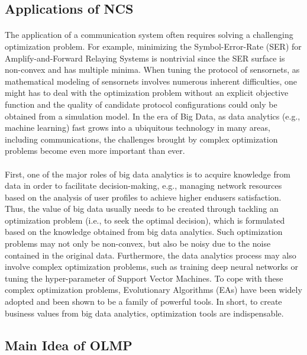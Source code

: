 \documentclass[10pt,letterpaper]{article}
\begin{document}
\subsection{Applications of NCS}

\paragraph{}
The application of a communication system often requires solving a challenging optimization problem. For example, minimizing the Symbol-Error-Rate (SER) for Amplify-and-Forward Relaying Systems is nontrivial since the SER surface is non-convex and has multiple minima\cite{Ahmed2015Minimizing}. When tuning the protocol of sensornets\cite{TateEvolutionary}, as mathematical modeling of sensornets involves numerous inherent difficulties, one might has to deal with the optimization problem without an explicit objective function and the quality of candidate protocol configurations could only be obtained from a simulation model. In the era of Big Data, as data analytics (e.g., machine learning) fast grows into a ubiquitous technology in many areas, including communications, the challenges brought by complex optimization problems become even more important than ever.

\paragraph{}
First, one of the major roles of big data analytics is to acquire knowledge from data in order to facilitate decision-making, e.g., managing network resources based on the analysis of user profiles to achieve higher endusers satisfaction. Thus, the value of big data usually needs to be created through tackling an optimization problem (i.e., to seek the optimal decision), which is formulated based on the knowledge obtained from big data analytics. Such optimization problems may not only be non-convex, but also be noisy due to the noise contained in the original data. Furthermore, the data analytics process may also involve complex optimization problems, such as training deep neural networks or tuning the hyper-parameter of Support Vector Machines. To cope with these complex optimization problems, Evolutionary Algorithms (EAs) have been widely adopted and been shown to be a family of powerful tools. In short, to create business values from big data analytics, optimization tools are indispensable.

\subsection{Main Idea of OLMP}
\end{document}
